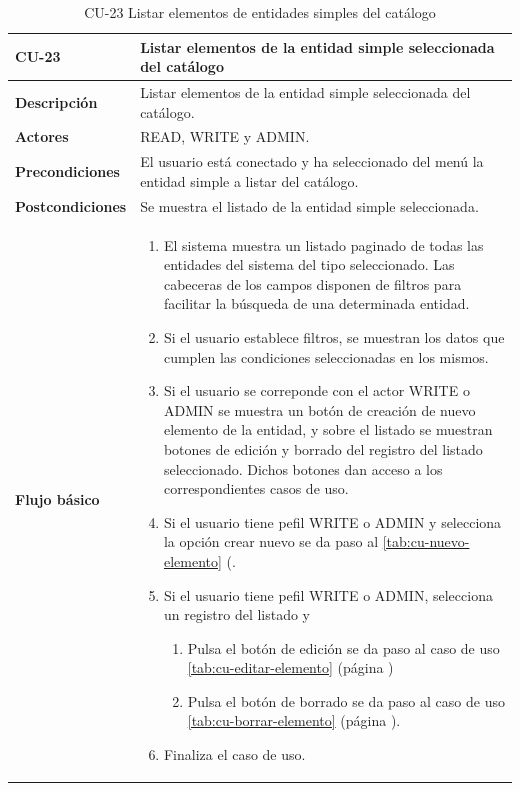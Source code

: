 \begin{table} [H]
    \centering
    \setlength{\leftmargini}{0.4cm}
	\resizebox{15cm}{!} { %
    \begin{tabular}{| m{3cm} | m{12cm} |}   
    \hline
	  \textbf{CU-23} & \textbf{Listar elementos de la entidad simple seleccionada del catálogo} \\\hline
	  \textbf{Descripción} & Listar elementos de la entidad simple seleccionada del catálogo. \\\hline
	  \textbf{Actores} & READ, WRITE y ADMIN. \\\hline
	  \textbf{Precondiciones} & El usuario está conectado y ha seleccionado del menú la entidad simple a listar del catálogo. \\\hline
	  \textbf{Postcondiciones} & Se muestra el listado de la entidad simple seleccionada. \\\hline
	  \textbf{Flujo básico} & 
		\begin{enumerate}
	  	\item El sistema muestra un listado paginado de todas las entidades del sistema del tipo seleccionado. Las
cabeceras de los campos disponen de filtros para facilitar la búsqueda de una determinada entidad.
		\item Si el usuario establece filtros, se muestran los datos que cumplen las condiciones seleccionadas en los mismos.
		\item Si el usuario se correponde con el actor WRITE o ADMIN se muestra un botón de creación de nuevo elemento de la entidad, y sobre el listado se muestran botones de edición y borrado del registro del listado seleccionado. Dichos botones dan acceso a los correspondientes casos de uso.
		\item Si el usuario tiene pefil WRITE o ADMIN y selecciona la opción crear nuevo se da paso al \ref{tab:cu-nuevo-elemento} (\pageref{tab:cu-nuevo-elemento}.
		\item Si el usuario tiene pefil WRITE o ADMIN, selecciona un registro del listado y
		    \begin{enumerate}
		        \item Pulsa el botón de edición se da paso al caso de uso \ref{tab:cu-editar-elemento} (página \pageref{tab:cu-editar-elemento})
		        \item Pulsa el botón de borrado se da paso al caso de uso \ref{tab:cu-borrar-elemento} (página \pageref{tab:cu-borrar-elemento}).
		    \end{enumerate} 
		\item Finaliza el caso de uso.		
	  \end{enumerate} 	  	  
	  \\\hline
    \end{tabular}
    } %
    \caption{CU-23 Listar elementos de entidades simples del catálogo}
    \label{tab:cu-listar-catalogo-simple}
\end{table}



